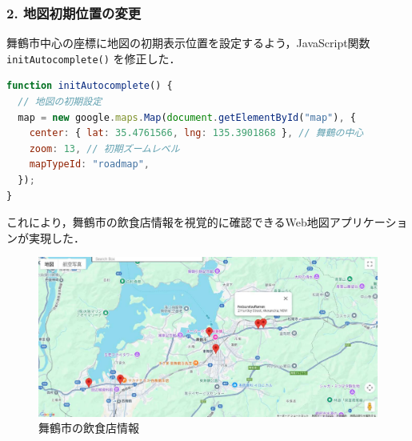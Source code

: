 \subsubsection*{2. 地図初期位置の変更}

舞鶴市中心の座標に地図の初期表示位置を設定するよう，JavaScript関数 \texttt{initAutocomplete()} を修正した．

\begin{lstlisting}[language=javascript]
function initAutocomplete() {
  // 地図の初期設定
  map = new google.maps.Map(document.getElementById("map"), {
    center: { lat: 35.4761566, lng: 135.3901868 }, // 舞鶴の中心
    zoom: 13, // 初期ズームレベル
    mapTypeId: "roadmap",
  });
}
\end{lstlisting}

これにより，舞鶴市の飲食店情報を視覚的に確認できるWeb地図アプリケーションが実現した．

\begin{figure}[htbp]
  \centering
  \includegraphics[width=0.9\linewidth]{figure/12.pdf}
  \caption{舞鶴市の飲食店情報}
\end{figure}
